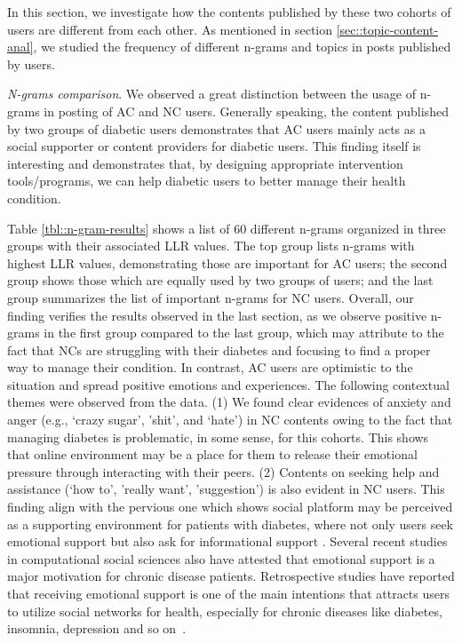 \documentclass{acm_proc_article-sp}
\begin{document}
In this section, we investigate how the contents published by these two cohorts of users are different from each other. As mentioned in section \ref{sec::topic-content-anal}, we studied the frequency of different n-grams and topics in posts published by users.

\emph{N-grams comparison}. We observed a great distinction between the usage of n-grams in posting of AC and NC users. Generally speaking, the content published by two groups of diabetic users demonstrates that AC users mainly acts as a social supporter or content providers for diabetic users. This finding itself is interesting and demonstrates that, by designing appropriate intervention tools/programs, we can help diabetic users to better manage their health condition.

 Table \ref{tbl::n-gram-results} shows a list of $60$ different n-grams organized in three groups with their associated LLR values. The top group lists n-grams with highest LLR values, demonstrating those are important for AC users; the second group shows those which are equally used by two groups of users; and the last group summarizes the list of important n-grams for NC users. Overall, our finding verifies the results observed in the last section, as we observe positive n-grams in the first group compared to the last group, which may attribute to the fact that NCs are struggling with their diabetes and focusing to find a proper way to manage their condition. In contrast, AC users are optimistic to the situation and spread positive emotions and experiences. The following contextual themes were observed from the data. (1) We found clear evidences of anxiety and anger (e.g., `crazy sugar', 'shit', and `hate') in NC contents owing to the fact that managing diabetes is problematic, in some sense, for this cohorts. This shows that online environment may be a place for them to release their emotional pressure through interacting with their peers. (2) Contents on seeking help and assistance (`how to', 'really want', 'suggestion') is also evident in NC users. This finding align with the pervious one which shows social platform may be perceived as a supporting environment for patients with diabetes, where not only users seek emotional support but also ask for informational support \cite{wang2012stay}. Several recent studies in computational social sciences also have attested that emotional support is a major motivation for chronic disease patients. Retrospective studies have reported that receiving emotional support is one of the main intentions that attracts users to utilize social networks for health, especially for chronic diseases like diabetes, insomnia, depression and so on~\cite{greene2011online,jamison2012can,taylor1988illusion}.
\end{document}
